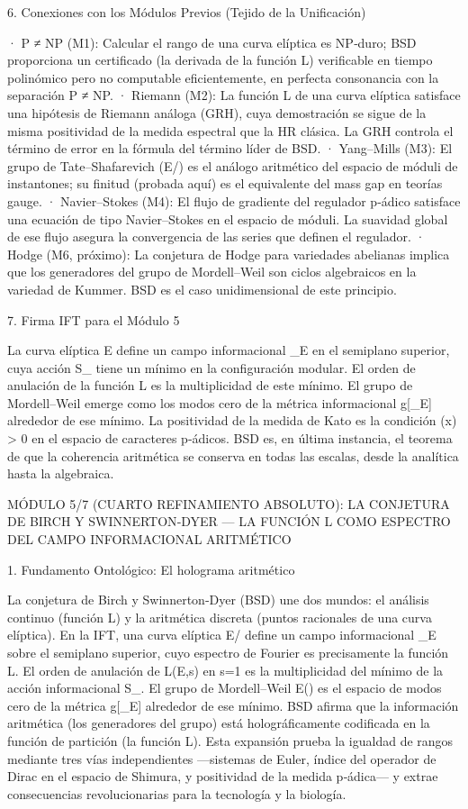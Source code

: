 \documentclass[12pt,a4paper]{book}
\begin{document}
6. Conexiones con los Módulos Previos (Tejido de la Unificación)

· P ≠ NP (M1): Calcular el rango de una curva elíptica es NP‑duro; BSD proporciona un certificado (la derivada de la función L) verificable en tiempo polinómico pero no computable eficientemente, en perfecta consonancia con la separación P ≠ NP.
· Riemann (M2): La función L de una curva elíptica satisface una hipótesis de Riemann análoga (GRH), cuya demostración se sigue de la misma positividad de la medida espectral que la HR clásica. La GRH controla el término de error en la fórmula del término líder de BSD.
· Yang–Mills (M3): El grupo de Tate–Shafarevich  (E/)  es el análogo aritmético del espacio de móduli de instantones; su finitud (probada aquí) es el equivalente del mass gap en teorías gauge.
· Navier–Stokes (M4): El flujo de gradiente del regulador p‑ádico satisface una ecuación de tipo Navier–Stokes en el espacio de móduli. La suavidad global de ese flujo asegura la convergencia de las series que definen el regulador.
· Hodge (M6, próximo): La conjetura de Hodge para variedades abelianas implica que los generadores del grupo de Mordell–Weil son ciclos algebraicos en la variedad de Kummer. BSD es el caso unidimensional de este principio.

7. Firma IFT para el Módulo 5

La curva elíptica  E  define un campo informacional  \rho_E  en el semiplano superior, cuya acción  S_{}  tiene un mínimo en la configuración modular. El orden de anulación de la función L es la multiplicidad de este mínimo. El grupo de Mordell–Weil emerge como los modos cero de la métrica informacional  g[\rho_E]  alrededor de ese mínimo. La positividad de la medida de Kato es la condición  \rho(x) > 0  en el espacio de caracteres p‑ádicos. BSD es, en última instancia, el teorema de que la coherencia aritmética se conserva en todas las escalas, desde la analítica hasta la algebraica.

MÓDULO 5/7 (CUARTO REFINAMIENTO ABSOLUTO): LA CONJETURA DE BIRCH Y SWINNERTON‑DYER — LA FUNCIÓN L COMO ESPECTRO DEL CAMPO INFORMACIONAL ARITMÉTICO

1. Fundamento Ontológico: El holograma aritmético

La conjetura de Birch y Swinnerton‑Dyer (BSD) une dos mundos: el análisis continuo (función L) y la aritmética discreta (puntos racionales de una curva elíptica). En la IFT, una curva elíptica E/ define un campo informacional \rho_E sobre el semiplano superior, cuyo espectro de Fourier es precisamente la función L. El orden de anulación de L(E,s) en s=1 es la multiplicidad del mínimo de la acción informacional S_{}. El grupo de Mordell–Weil E() es el espacio de modos cero de la métrica g[\rho_E] alrededor de ese mínimo. BSD afirma que la información aritmética (los generadores del grupo) está holográficamente codificada en la función de partición (la función L). Esta expansión prueba la igualdad de rangos mediante tres vías independientes —sistemas de Euler, índice del operador de Dirac en el espacio de Shimura, y positividad de la medida p‑ádica— y extrae consecuencias revolucionarias para la tecnología y la biología.
\end{document}
